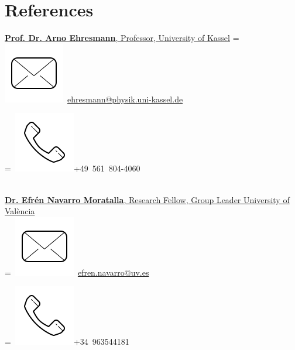 \begin{minipage}[t]{0.27\textwidth} 
\section{References} 
\href{http://ag-ehresmann.de/}{\textbf{Prof. Dr. Arno Ehresmann}, Professor, University of Kassel}
\begingroup
{}=\hbox{
\includegraphics[scale=0.1,trim={0 1cm 0cm 0cm}]{icons/main/mail.png}\hspace{0.1cm}
\href{mailto:ehresmann@physik.uni-kassel.de}{ehresmann@physik.uni-kassel.de} 
}
\parbox{\wd0}{}
\endgroup
\begingroup
{}=\hbox{
\includegraphics[scale=0.1,trim={0 1.25cm -0.4cm 0cm}]{icons/main/phone.png}\hspace{0.1cm}+49 561 804-4060
}
\parbox{\wd0}{}\endgroup
\\
\sectionsep
\href{https://www.linkedin.com/in/navarro-moratalla-efrén-1bb1b4a5/?originalSubdomain=es} {\textbf{Dr. Efrén Navarro Moratalla}, Research Fellow, Group Leader University of València} 
\\
\begingroup
{}=\hbox{
\includegraphics[scale=0.1,trim={0 1cm 0cm 0cm}]{icons/main/mail.png}\hspace{0.1cm}  	\href{mailto:efren.navarro@uv.es}{efren.navarro@uv.es}
}
\parbox{\wd0}{}
\endgroup
\begingroup
{}=\hbox{
\includegraphics[scale=0.1,trim={0 1.25cm -0.4cm 0cm}]{icons/main/phone.png}\hspace{0.1cm}+34 963544181
}
\end{minipage}
